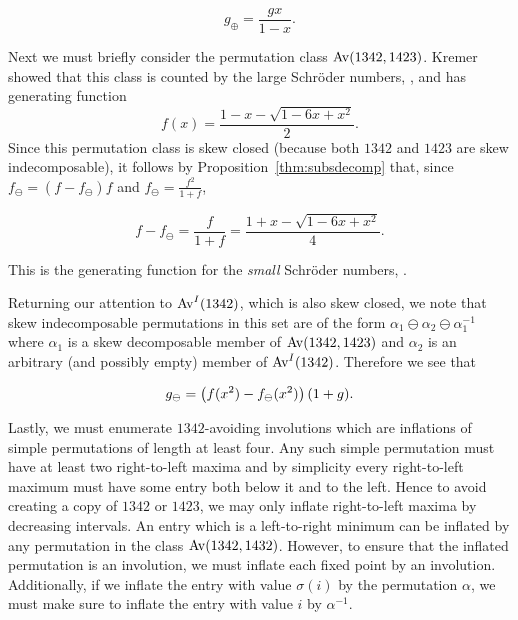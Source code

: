       \begin{equation}
      \label{involutions:eqn:1342-1}
      g_\oplus = \frac{gx}{1-x}.
      \end{equation}

    Next we must briefly consider the permutation class $\operatorname{{Av}}(1342,1423)$.
    Kremer~\cite{Kremer2000, KremerPS} showed that
    this class is counted by the large Schr\"oder numbers, , and
    has generating function 
    $$ f(x) = \frac{1-x-\sqrt{1-6x+x^2}}{2}. $$
    Since this permutation class is skew closed (because both $1342$ and $1423$
    are skew indecomposable), it follows by Proposition~\ref{thm:subsdecomp}
    that, since 
    $f_\ominus = (f - f_\ominus)f$ and $f_\ominus = \frac{f^2}{1+f}$, 

    $$ f - f_\ominus = \frac{f}{1+f} = \frac{1+x-\sqrt{1-6x+x^2}}{4}. $$

    This is the generating function for the \emph{small} Schr\"oder numbers,
    . 


    Returning our attention to $\operatorname{{Av}}^I(1342)$, which is also skew closed, we
    note that skew indecomposable permutations in this set are of the form
    $\alpha_1\ominus\alpha_2\ominus\alpha_1^{-1}$ where $\alpha_1$ is a skew
    decomposable member of $\operatorname{{Av}}(1342,1423)$ and $\alpha_2$ is an arbitrary (and
    possibly empty) member of $\operatorname{{Av}}^I(1342)$. Therefore we see that

    \begin{equation}
      \label{involutions:eqn:1342-2}
      g_\ominus = \left({f(x^2)-f_\ominus(x^2)}\right)(1+g).
    \end{equation}
      
    Lastly, we must enumerate $1342$-avoiding involutions which are inflations of
    simple permutations of length at least four. Any such simple permutation must
    have at least two right-to-left maxima and by simplicity every right-to-left
    maximum must have some entry both below it and to the left. Hence to avoid
    creating a copy of $1342$ or $1423$, we may only inflate right-to-left maxima
    by decreasing intervals. An entry which is a left-to-right minimum can be
    inflated by any permutation in the class $\operatorname{{Av}}(1342,1432)$. However, to ensure
    that the inflated permutation is an involution, we must inflate each fixed
    point by an involution. Additionally, if we inflate the entry with value
    $\sigma(i)$ by the permutation $\alpha$, we must make sure to inflate the
    entry with value $i$ by $\alpha^{-1}$.

